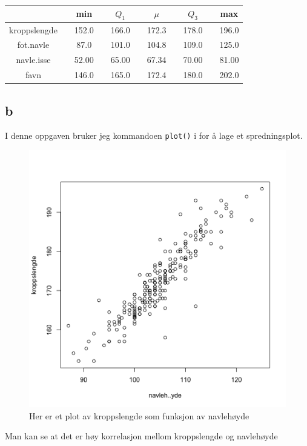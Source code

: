 \begin{center}
\label{tab:summary}
\begin{tabularx}{\textwidth}{c X c X c X c X c X c }
    \hline
    \hline
         && min && $Q_1$ && $\mu$ && $Q_3$ && max \\
    \hline
    kroppslengde    && 152.0 && 166.0 && 172.3 && 178.0 && 196.0 \\
    fot.navle       &&  87.0 && 101.0 && 104.8 && 109.0 && 125.0 \\
    navle.isse      && 52.00 && 65.00 && 67.34 && 70.00 && 81.00 \\
    favn            && 146.0 && 165.0 && 172.4 && 180.0 && 202.0 \\

    \hline
\end{tabularx}
\end{center}

\subsection*{b}
I denne oppgaven bruker jeg kommandoen \texttt{plot()} i for å lage et spredningsplot. 

\begin{figure}[H]
        \centering
        \includegraphics[width=0.9\linewidth]{3B.pdf}
        \caption{Her er et plot av kroppslengde som funksjon av navlehøyde}
        \label{fig:3B}
\end{figure}
Man kan se at det er høy korrelasjon mellom kroppslengde og navlehøyde

